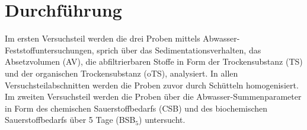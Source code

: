 \chapter{Durchführung}
\label{sec:durchfuerung}
Im ersten Versuchsteil werden die drei Proben mittels Abwasser-Feststoffuntersuchungen, sprich über das Sedimentationsverhalten, das Absetzvolumen (AV), die abfiltrierbaren Stoffe in Form der Trockensubstanz (TS) und der organischen Trockensubstanz (oTS), analysiert. In allen Versuchsteilabschnitten werden die Proben zuvor durch Schütteln homogenisiert.\\



Im zweiten Versuchsteil werden die Proben über die Abwasser-Summenparameter in Form des chemischen Sauerstoffbedarfs (CSB) und des biochemischen Sauerstoffbedarfs über 5 Tage (BSB$_5$) untersucht.
